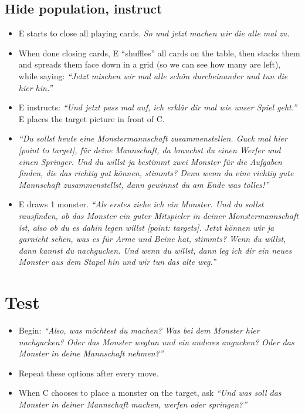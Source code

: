\documentclass{article}
\begin{document}
\subsection{Hide population, instruct}

\begin{itemize}
\item
  E starts to close all playing cards. \emph{So und jetzt machen wir die alle mal zu.}
\item
  When done closing cards, E ``shuffles'' all cards on the table, then stacks them and spreads them face down in a grid (so we can see how many are left), while saying:
  \emph{``Jetzt mischen wir mal alle schön durcheinander und tun die hier hin.''}
\item
  E instructs: \emph{``Und jetzt pass mal auf, ich erklär dir mal wie unser Spiel geht.''}
  E places the target picture in front of C.
\item
  \emph{``Du sollst heute eine Monstermannschaft zusammenstellen.
  Guck mal hier {[}point to target{]}, für deine Mannschaft, da brauchst du einen Werfer und einen Springer.
  Und du willst ja bestimmt zwei Monster für die Aufgaben finden, die das richtig gut können, stimmts?
  Denn wenn du eine richtig gute Mannschaft zusammenstellst, dann gewinnst du am Ende was tolles!''}
\item
  E draws 1 monster.
  \emph{``Als erstes ziehe ich ein Monster.
  Und du sollst rausfinden, ob das Monster ein guter Mitspieler in deiner Monstermannschaft ist, also ob du es dahin legen willst {[}point: targets{]}.
  Jetzt können wir ja garnicht sehen, was es für Arme und Beine hat, stimmts?
  Wenn du willst, dann kannst du nachgucken.
  Und wenn du willst, dann leg ich dir ein neues Monster aus dem Stapel hin und wir tun das alte weg.''} \\
  
\end{itemize}

\section{Test}\label{test}

\begin{itemize}
\item
  Begin: \emph{``Also, was möchtest du machen?
  Was bei dem Monster hier nachgucken?
  Oder das Monster wegtun und ein anderes angucken?
  Oder das Monster in deine Mannschaft nehmen?''}
\item
  Repeat these options after every move.
\item
  When C chooses to place a monster on the target, ask \emph{``Und was soll das Monster in deiner Mannschaft machen, werfen oder springen?''}
\end{itemize}
\end{document}
